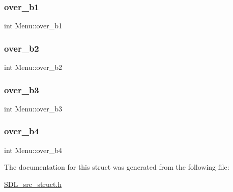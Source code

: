 \mbox{\label{structMenu_a0ba92851941ea1b803bbd6f2ba66ff89}} 
\subsubsection{\texorpdfstring{over\_b1}{over\_b1}}
{\footnotesize\ttfamily int Menu\+::over\+\_\+b1}

\mbox{\label{structMenu_a784b690794a131e672b4a3107c2431ac}} 
\subsubsection{\texorpdfstring{over\_b2}{over\_b2}}
{\footnotesize\ttfamily int Menu\+::over\+\_\+b2}

\mbox{\label{structMenu_a5310cc8336a6ec6e540f519428dbef60}} 
\subsubsection{\texorpdfstring{over\_b3}{over\_b3}}
{\footnotesize\ttfamily int Menu\+::over\+\_\+b3}

\mbox{\label{structMenu_a1c5318e7c3fd0b29aa561615c1de7f59}} 
\subsubsection{\texorpdfstring{over\_b4}{over\_b4}}
{\footnotesize\ttfamily int Menu\+::over\+\_\+b4}



The documentation for this struct was generated from the following file\+:\begin{DoxyCompactItemize}
\item 
\mbox{\hyperlink{SDL__src__struct_8h}{S\+D\+L\+\_\+src\+\_\+struct.\+h}}\end{DoxyCompactItemize}
